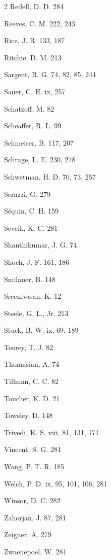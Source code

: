 \begin{multicols}{2}
\noindent Redell, D. D. 284\par
\columnbreak
\noindent Reeves, C. M. 222, 243\par
\noindent Rice, J. R. 133, 187\par
\noindent Ritchie, D. M. 213\par
\noindent Sargent, R. G. 74, 82, 85, 244\par
\noindent Sauer, C. H. ix, 257\par
\noindent Schatzoff, M. 82\par
\noindent Scheaffer, R. L. 99\par
\noindent Schmeiser, B. 117, 207\par
\noindent Schrage, L. E. 230, 278\par
\noindent Schwetman, H. D. 70, 73, 257\par
\noindent Serazzi, G. 279\par
\noindent S\'equin, C. H. 159\par
\noindent Sevcik, K. C. 281\par
\noindent Shanthikumar, J. G. 74\par
\noindent Shoch, J. F. 161, 186\par
\noindent Smilauer, B. 148\par
\noindent Sreenivasan, K. 12\par
\noindent Steele, G. L., Jr. 213\par
\noindent Stuck, B. W. ix, 69, 189\par
\noindent Teorey, T. J. 82\par
\noindent Thomasian, A. 74\par
\noindent Tillman, C. C. 82\par
\noindent Toucher, K. D. 21\par
\noindent Towsley, D. 148\par
\noindent Trivedi, K. S. viii, 81, 131, 171\par
\noindent Vincent, S. G. 281\par
\noindent Wang, P. T. R. 185\par
\noindent Welch, P. D. ix, 95, 101, 106, 281\par
\noindent Winsor, D. C. 282\par
\noindent Zahorjan, J. 87, 281\par
\noindent Zeigner, A. 279\par
\noindent Zwaenepoel, W. 281\par
\end{multicols}
